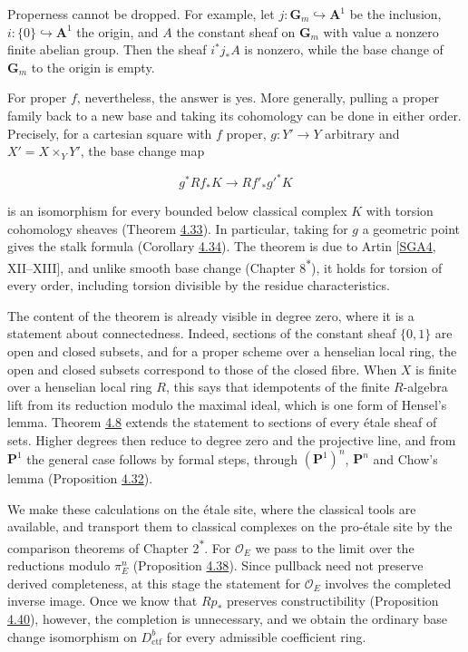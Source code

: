 \documentclass[11pt]{article}
\newcommand{\bpout}[1]{#1\textsuperscript{\hyperlink{bp-outside}{\ensuremath{\ast}}}}
\begin{document}
Properness cannot be dropped. For example, let \(j:\mathbf G_m\hookrightarrow\mathbf A^1\) be the inclusion, \(i:\{0\}\hookrightarrow\mathbf A^1\) the origin, and \(A\) the constant sheaf on \(\mathbf G_m\) with value a nonzero finite abelian group. Then the sheaf \(i^*j_*A\) is nonzero, while the base change of \(\mathbf G_m\) to the origin is empty.

For proper \(f\), nevertheless, the answer is yes. More generally, pulling a proper family back to a new base and taking its cohomology can be done in either order. Precisely, for a cartesian square with \(f\) proper, \(g:Y'\to Y\) arbitrary and \(X'=X\times_YY'\), the base change map

\[
g^*Rf_*K\longrightarrow Rf'_*g'^*K
\]

is an isomorphism for every bounded below classical complex \(K\) with torsion cohomology sheaves (Theorem \hyperref[bp98]{4.33}). In particular, taking for \(g\) a geometric point gives the stalk formula (Corollary \hyperref[bp102]{4.34}). The theorem is due to Artin [\hyperref[bp123]{SGA4}, XII–XIII], and unlike smooth base change (Chapter \bpout{8}), it holds for torsion of every order, including torsion divisible by the residue characteristics.

The content of the theorem is already visible in degree zero, where it is a statement about connectedness. Indeed, sections of the constant sheaf \(\{0,1\}\) are open and closed subsets, and for a proper scheme over a henselian local ring, the open and closed subsets correspond to those of the closed fibre. When \(X\) is finite over a henselian local ring \(R\), this says that idempotents of the finite \(R\)-algebra lift from its reduction modulo the maximal ideal, which is one form of Hensel's lemma. Theorem \hyperref[bp24]{4.8} extends the statement to sections of every étale sheaf of sets. Higher degrees then reduce to degree zero and the projective line, and from \(\mathbf P^1\) the general case follows by formal steps, through \((\mathbf P^1)^n\), \(\mathbf P^n\) and Chow's lemma (Proposition \hyperref[bp94]{4.32}).

We make these calculations on the étale site, where the classical tools are available, and transport them to classical complexes on the pro-étale site by the comparison theorems of Chapter \bpout{2}. For \(\mathcal O_E\) we pass to the limit over the reductions modulo \(\pi_E^n\) (Proposition \hyperref[bp113]{4.38}). Since pullback need not preserve derived completeness, at this stage the statement for \(\mathcal O_E\) involves the completed inverse image. Once we know that \(Rp_*\) preserves constructibility (Proposition \hyperref[bp121]{4.40}), however, the completion is unnecessary, and we obtain the ordinary base change isomorphism on \(D^b_{\mathrm{ctf}}\) for every admissible coefficient ring.
\end{document}
